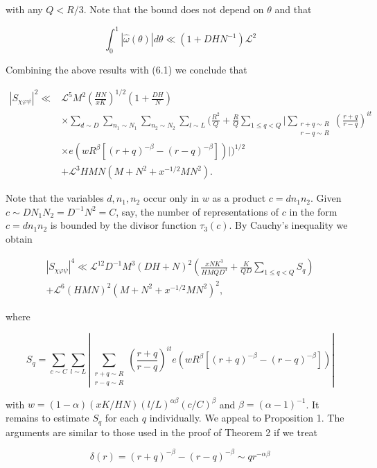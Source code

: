 \documentclass[10pt]{article}
\begin{document}
with any $Q<R/3$. Note that the bound does not depend on $\theta$ and that

$$
\int_{0}^{1}|\widehat{\omega}(\theta)| d \theta \ll\left(1+D H N^{-1}\right) \mathscr{L}^{2}
$$

Combining the above results with (6.1) we conclude that

$$
\begin{aligned}
\left|S_{\chi\varphi\psi}\right|^{2} \ll & \mathscr{L}^{5} M^{2}\left(\frac{H N}{x K}\right)^{1 / 2}\left(1+\frac{D H}{N}\right) \\
& \times \sum_{d\sim D}\sum_{n_1\sim N_1}\sum_{n_2\sim N_2}\sum_{l\sim L}
\Bigg(\frac{R^2}{Q}+\frac{R}{Q}\sum_{1\leqslant q<Q}
\Bigg|\sum_{\substack{r+q\sim R\\r-q\sim R}}
\left(\frac{r+q}{r-q}\right)^{it} \\
& \times e\left(wR^{\beta}\left[(r+q)^{-\beta}-(r-q)^{-\beta}\right]\right)\Bigg|\Bigg)^{1/2} \\
& +\mathscr{L}^{3} H M N\left(M+N^{2}+x^{-1 / 2} M N^{2}\right) .
\end{aligned}
$$

Note that the variables $d, n_{1}, n_{2}$ occur only in $w$ as a product $c=d n_{1} n_{2}$. Given $c \sim D N_{1} N_{2}=D^{-1} N^{2}=C$, say, the number of representations of $c$ in the form $c=d n_{1} n_{2}$ is bounded by the divisor function $\tau_{3}(c)$. By Cauchy's inequality we obtain

$$
\begin{gathered}
\left|S_{\chi\varphi\psi}\right|^{4} \ll \mathscr{L}^{12} D^{-1} M^{3}(D H+N)^{2}\left(\frac{x N K^{3}}{H M Q D^{3}}+\frac{K}{Q D} \sum_{1 \leqslant q<Q} S_{q}\right) \\
+\mathscr{L}^{6}(H M N)^{2}\left(M+N^{2}+x^{-1 / 2} M N^{2}\right)^{2},
\end{gathered}
$$

where

$$
S_{q}=\sum_{c \sim C} \sum_{l \sim L}\left|\sum_{\substack{r+q \sim R \\ r-q \sim R}}\left(\frac{r+q}{r-q}\right)^{i t} e\left(w R^{\beta}\left[(r+q)^{-\beta}-(r-q)^{-\beta}\right]\right)\right|
$$

with $w=(1-\alpha)(xK/HN)(l/L)^{\alpha\beta}(c / C)^{\beta}$ and $\beta=(\alpha-1)^{-1}$. It remains to estimate $S_{q}$ for each $q$ individually. We appeal to Proposition 1. The arguments are similar to those used in the proof of Theorem 2 if we treat

$$
\delta(r)=(r+q)^{-\beta}-(r-q)^{-\beta} \sim q r^{-\alpha \beta}
$$
\end{document}

